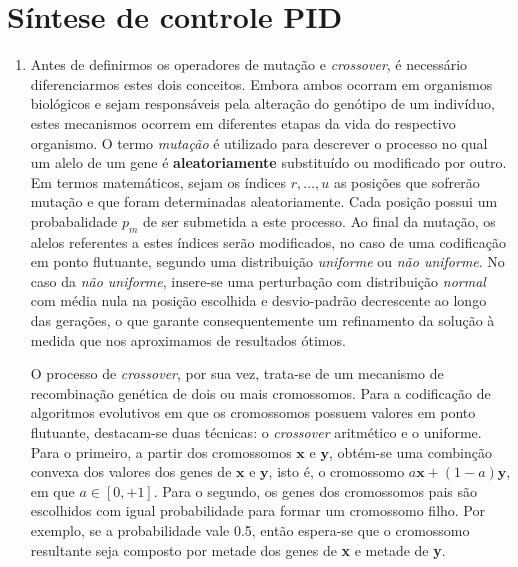\section{Síntese de controle PID}

\begin {enumerate}
  \item Antes de definirmos os operadores de mutação e \textit{crossover}, é
  necessário diferenciarmos estes dois conceitos. Embora ambos ocorram em
  organismos biológicos e sejam responsáveis pela alteração do genótipo de um
  indivíduo, estes mecanismos ocorrem em diferentes etapas da vida do respectivo
  organismo. O termo \textit{mutação} é utilizado para descrever o processo no
  qual um alelo de um gene é \textbf{aleatoriamente} substituído ou modificado
  por outro. Em termos matemáticos, sejam os índices \(r, \ldots, u\) as
  posições que sofrerão mutação e que foram determinadas aleatoriamente. Cada
  posição possui um probabalidade \(p_m\) de ser submetida a este processo. Ao
  final da mutação, os alelos referentes a estes índices serão modificados, no
  caso de uma codificação em ponto flutuante, segundo uma distribuição
  \textit{uniforme} ou \textit{não uniforme}. No caso da \textit{não uniforme},
  insere-se uma perturbação com distribuição \textit{normal} com média nula na
  posição escolhida e desvio-padrão decrescente ao longo das gerações, o que
  garante consequentemente um refinamento da solução à medida que nos
  aproximamos de resultados ótimos. 
  
  O processo de \textit{crossover}, por sua vez, trata-se de um mecanismo de
  recombinação genética de dois ou mais cromossomos. Para a codificação de
  algoritmos evolutivos em que os cromossomos possuem valores em ponto
  flutuante, destacam-se duas técnicas: o \textit{crossover} aritmético e o
  uniforme. Para o primeiro, a partir dos cromossomos \(\textbf{x}\) e \(\textbf{y}\),
  obtém-se uma combinção convexa dos valores dos genes de \(\textbf{x}\) e
  \(\textbf{y}\), isto é, o cromossomo \(a\textbf{x} + (1-a)\textbf{y}\), em que
  \(a \in [0, +1]\). Para o segundo, os genes dos cromossomos pais são
  escolhidos com igual probabilidade para formar um cromossomo filho. Por
  exemplo, se a probabilidade vale 0.5, então espera-se que o cromossomo
  resultante seja composto por metade dos genes de \textbf{x} e metade de
  \textbf{y}.
  

\end{enumerate}

